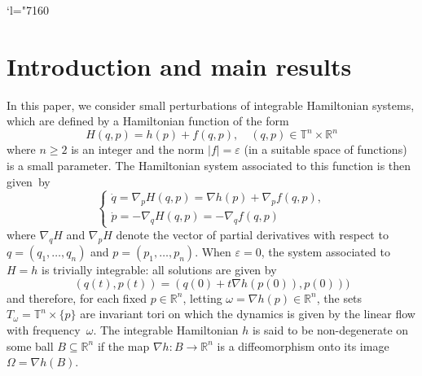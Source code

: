 \documentclass[11pt]{article}
\newcommand{\Changel}{\mathcode`l="7160}
\numberwithin{equation}{section}
\theoremstyle{plain}
\theoremstyle{definition}
\newcommand{\R}{\mathbb{R}}
\newcommand\T{\mathbb T}
\begin{document}
\Changel
\section{Introduction and main results}\label{s1}

In this paper, we consider small perturbations of integrable Hamiltonian systems, which are defined by a Hamiltonian function of the form
\[ H(q,p)=h(p)+f(q,p), \quad (q,p) \in \T^{n} \times \R^n \]
where $n\geq 2$ is an integer and the norm $|f|=\varepsilon$ (in a suitable space of functions) is a small parameter. The Hamiltonian system associated to this function is then given~by
\begin{equation*}
\begin{cases}
\dot{q}=\nabla_p H(q,p)=\nabla h (p)+ \nabla_p f(q,p),\\
\dot{p}=-\nabla_q H(q,p)=-\nabla_q f(q,p)
\end{cases}
\end{equation*}
where $\nabla_q H$ and $\nabla_p H$ denote the vector of partial derivatives with respect to $q=(q_1,\dots,q_n)$ and $p=(p_1,\dots,p_n)$. When $\varepsilon=0$, the system associated to $H=h$ is trivially integrable: all solutions are given by
\[ (q(t),p(t))=(q(0)+t \nabla h (p(0)),p(0))) \]
and therefore, for each fixed $p \in \R^n$, letting $\omega=\nabla h(p) \in \R^n$, the sets $T_{\omega}=\T^n \times \{p\}$ are invariant tori on which the dynamics is given by the linear flow with frequency~$\omega$. The integrable Hamiltonian $h$ is said to be non-degenerate on some ball $B \subseteq \R^n$ if the map $\nabla h : B \to \R^n$ is a diffeomorphism onto its image $\Omega=\nabla h(B)$.
\end{document}
